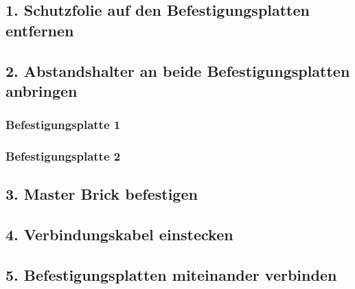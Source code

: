 \documentclass[
  letterpaper,
  DIV=11]{scrreprt}
\begin{document}

\subsection*{1. Schutzfolie auf den Befestigungsplatten
entfernen}\label{schutzfolie-auf-den-befestigungsplatten-entfernen}

\subsection*{2. Abstandshalter an beide Befestigungsplatten
anbringen}\label{abstandshalter-an-beide-befestigungsplatten-anbringen}

\subsubsection*{Befestigungsplatte 1}\label{befestigungsplatte-1}

\subsubsection*{Befestigungsplatte 2}\label{befestigungsplatte-2}

\subsection*{3. Master Brick befestigen}\label{master-brick-befestigen}

\subsection*{4. Verbindungskabel
einstecken}\label{verbindungskabel-einstecken}

\subsection*{5. Befestigungsplatten miteinander
verbinden}\label{befestigungsplatten-miteinander-verbinden}
\end{document}
